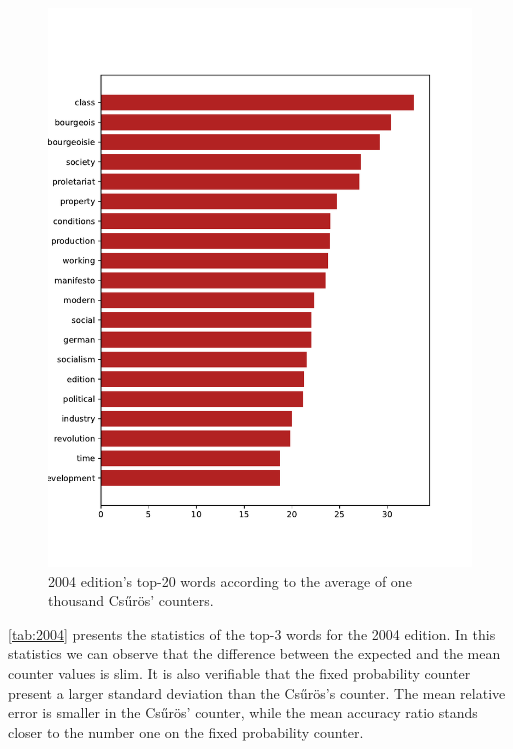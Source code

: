\begin{figure}[!ht]
    \centering
    \includegraphics[width=0.9\linewidth]{figs/2004.epub-csuros-1000}
    \caption{2004 edition's top-20 words according to the average of one thousand Csűrös' counters.}
    \label{fig:2004-20-csuros}
\end{figure}


\autoref{tab:2004} presents the statistics of the top-3 words for the 2004 edition.
In this statistics we can observe that the difference between the expected and the mean counter values is slim.
It is also verifiable that the fixed probability counter present a larger standard deviation than the Csűrös's counter.
The mean relative error is smaller in the Csűrös' counter, while the mean accuracy ratio stands closer to the number one on the fixed probability counter.


